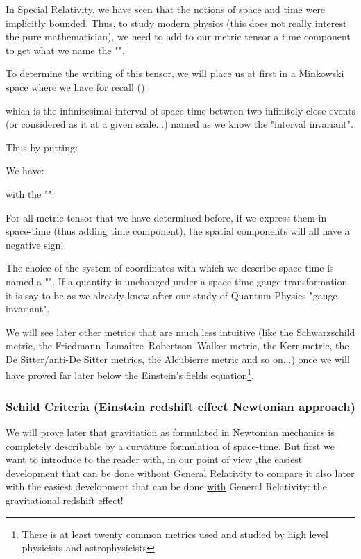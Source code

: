 	In Special Relativity, we have seen that the notions of space and time were implicitly bounded. Thus, to study modern physics (this does not really interest  the pure mathematician), we need to add to our metric tensor a time component  to get what we name the "".
	
	To determine the writing of this tensor, we will place us at first in a Minkowski space where we have for recall ()\label{minkowski metric general relativity}:
	
	which is the infinitesimal interval of space-time between two infinitely close events (or considered as it at a given scale...) named as we know the "interval invariant".

	Thus by putting:
	
	We have:
	
	with the "":
	
	\begin{tcolorbox}[title=Remark,colframe=black,arc=10pt]
	For all metric tensor that we have determined before, if we express them in space-time (thus adding time component), the spatial components will all have a negative sign!
	\end{tcolorbox}
	The choice of the system of coordinates with which we describe space-time is named a "". If a quantity is unchanged under a space-time gauge transformation, it is say to be as we already know after our study of Quantum Physics "gauge invariant".
	
	We will see later other metrics that are much less intuitive (like the Schwarzschild metric, the Friedmann–Lemaître–Robertson–Walker metric, the Kerr metric, the De Sitter/anti-De Sitter metrics, the Alcubierre metric and so on...) once we will have proved far later below the Einstein's fields equation\footnote{There is at least twenty common metrics used and studied by high level physicists and astrophysicists}.
	
	\subsubsection{Schild Criteria (Einstein redshift effect Newtonian approach)}
	We will prove later that gravitation as formulated in Newtonian mechanics is completely describable by a curvature formulation of space-time. But first we want to introduce to the reader with, in our point of view ,the easiest development that can be done \underline{without} General Relativity to compare it also later with the easiest development that can be done \underline{with} General Relativity: the gravitational redshift effect!
	
